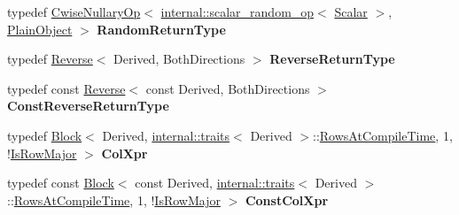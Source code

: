 \begin{DoxyCompactItemize}
\mbox{\label{class_eigen_1_1_dense_base_a050c96f67131df5e47e00c29446fb50d}} 
typedef \mbox{\hyperlink{class_eigen_1_1_cwise_nullary_op}{Cwise\+Nullary\+Op}}$<$ \mbox{\hyperlink{struct_eigen_1_1internal_1_1scalar__random__op}{internal\+::scalar\+\_\+random\+\_\+op}}$<$ \mbox{\hyperlink{class_eigen_1_1_dense_base_a5feed465b3a8e60c47e73ecce83e39a2}{Scalar}} $>$, \mbox{\hyperlink{class_eigen_1_1_dense_base_aae45af9b5aca5a9caae98fd201f47cc4}{Plain\+Object}} $>$ {\bfseries Random\+Return\+Type}
\item 
\mbox{\label{class_eigen_1_1_dense_base_a7428b2b404ef14d402b76ee87b941442}} 
typedef \mbox{\hyperlink{class_eigen_1_1_reverse}{Reverse}}$<$ Derived, Both\+Directions $>$ {\bfseries Reverse\+Return\+Type}
\item 
\mbox{\label{class_eigen_1_1_dense_base_af49b9a56cfe2d2dc02e18dc073bcfbfa}} 
typedef const \mbox{\hyperlink{class_eigen_1_1_reverse}{Reverse}}$<$ const Derived, Both\+Directions $>$ {\bfseries Const\+Reverse\+Return\+Type}
\item 
\mbox{\label{class_eigen_1_1_dense_base_a125b308bb50ba123174d2399f897d6a0}} 
typedef \mbox{\hyperlink{class_eigen_1_1_block}{Block}}$<$ Derived, \mbox{\hyperlink{struct_eigen_1_1internal_1_1traits}{internal\+::traits}}$<$ Derived $>$\+::\mbox{\hyperlink{class_eigen_1_1_dense_base_a86241c772c74c04eeeb0480b99c5ab77adb37c78ebbf15aa20b65c3b70415a1ab}{Rows\+At\+Compile\+Time}}, 1, !\mbox{\hyperlink{class_eigen_1_1_dense_base_a86241c772c74c04eeeb0480b99c5ab77a406b6af91d61d348ba1c9764bdd66008}{Is\+Row\+Major}} $>$ {\bfseries Col\+Xpr}
\item 
\mbox{\label{class_eigen_1_1_dense_base_a54144b270cb8b76de5806f4f1709ebe2}} 
typedef const \mbox{\hyperlink{class_eigen_1_1_block}{Block}}$<$ const Derived, \mbox{\hyperlink{struct_eigen_1_1internal_1_1traits}{internal\+::traits}}$<$ Derived $>$\+::\mbox{\hyperlink{class_eigen_1_1_dense_base_a86241c772c74c04eeeb0480b99c5ab77adb37c78ebbf15aa20b65c3b70415a1ab}{Rows\+At\+Compile\+Time}}, 1, !\mbox{\hyperlink{class_eigen_1_1_dense_base_a86241c772c74c04eeeb0480b99c5ab77a406b6af91d61d348ba1c9764bdd66008}{Is\+Row\+Major}} $>$ {\bfseries Const\+Col\+Xpr}
\item 

\end{DoxyCompactItemize}

